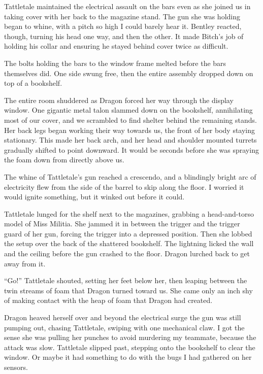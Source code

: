 Tattletale maintained the electrical assault on the bars even as she joined us in taking cover with her back to the magazine stand.  The gun she was holding began to whine, with a pitch so high I could barely hear it.  Bentley reacted, though, turning his head one way, and then the other.  It made Bitch's job of holding his collar and ensuring he stayed behind cover twice as difficult.



The bolts holding the bars to the window frame melted before the bars themselves did.  One side swung free, then the entire assembly dropped down on top of a bookshelf.



The entire room shuddered as Dragon forced her way through the display window.  One gigantic metal talon slammed down on the bookshelf, annihilating most of our cover, and we scrambled to find shelter behind the remaining stands.  Her back legs began working their way towards us, the front of her body staying stationary.  This made her back arch, and her head and shoulder mounted turrets gradually shifted to point downward.  It would be seconds before she was spraying the foam down from directly above us.



The whine of Tattletale's gun reached a crescendo, and a blindingly bright arc of electricity flew from the side of the barrel to skip along the floor.  I worried it would ignite something, but it winked out before it could.



Tattletale lunged for the shelf next to the magazines, grabbing a head-and-torso model of Miss Militia.  She jammed it in between the trigger and the trigger guard of her gun, forcing the trigger into a depressed position.  Then she lobbed the setup over the back of the shattered bookshelf.  The lightning licked the wall and the ceiling before the gun crashed to the floor.  Dragon lurched back to get away from it.



``Go!'' Tattletale shouted, setting her feet below her, then leaping between the twin streams of foam that Dragon turned toward us.  She came only an inch shy of making contact with the heap of foam that Dragon had created.



Dragon heaved herself over and beyond the electrical surge the gun was still pumping out, chasing Tattletale, swiping with one mechanical claw.  I got the sense she was pulling her punches to avoid murdering my teammate, because the attack was slow.  Tattletale slipped past, stepping onto the bookshelf to clear the window.  Or maybe it had something to do with the bugs I had gathered on her sensors.



